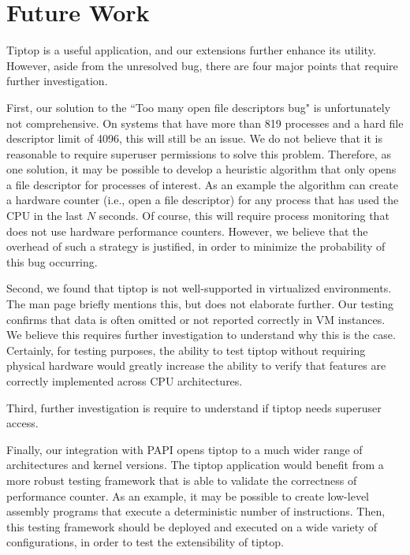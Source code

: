 \section{Future Work}
\label{sec:conclusion}
Tiptop is a useful application, and our extensions further enhance its utility.
However, aside from the unresolved bug, there are four major points that require further investigation.

First, our solution to the ``Too many open file descriptors bug" is unfortunately not comprehensive. On systems that have more than 819 processes and a hard file descriptor limit of 4096, this will still be an issue.
We do not believe that it is reasonable to require superuser permissions to solve this problem.
Therefore, as one solution, it may be possible to develop a heuristic algorithm that only opens a file descriptor for processes of interest.
As an example the algorithm can create a hardware counter (i.e., open a file descriptor) for any process that has used the CPU in the last $N$ seconds.
Of course, this will require process monitoring that does not use hardware performance counters.
However, we believe that the overhead of such a strategy is justified, in order to minimize the probability of this bug occurring.

Second, we found that tiptop is not well-supported in virtualized environments.
The man page briefly mentions this, but does not elaborate further.
Our testing confirms that data is often omitted or not reported correctly in VM instances.
We believe this requires further investigation to understand why this is the case.
Certainly, for testing purposes, the ability to test tiptop without requiring physical hardware would greatly increase the ability to verify that features are correctly implemented across CPU architectures.

Third, further investigation is require to understand if tiptop needs superuser access.

Finally, our integration with PAPI opens tiptop to a much wider range of architectures and kernel versions. The tiptop application would benefit from a more robust testing framework that is able to validate the correctness of performance counter.
As an example, it may be possible to create low-level assembly programs that execute a deterministic number of instructions.
Then, this testing framework should be deployed and executed on a wide variety of configurations, in order to test the extensibility of tiptop.